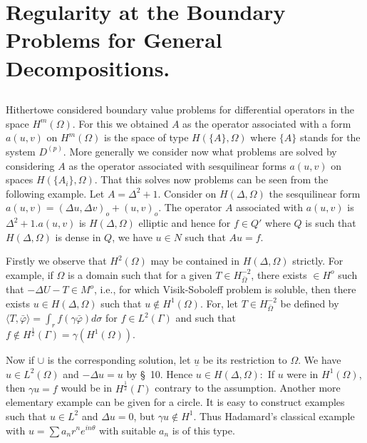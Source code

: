 \section[Regularity at the Boundary Problems for...]{Regularity at the Boundary Problems for General Decompositions.}\label{lec24:sec13}%

\subsection{}\label{lec24:sec13:subsec1} 

Hitherto\pageoriginale we considered boundary value problems for differential 
operators in the space $H^m (\Omega)$. For this we obtained $A$ as the
operator associated with a form $a (u, v)$ on $H^m(\Omega)$ is the
space of type $H(\{A\}, \Omega)$ where $\{A\}$ stands for the system
$D^{(p)}$. More generally we consider now what problems are solved by
considering $A$ as the operator associated with sesquilinear forms
$a(u, v)$ on spaces $H(\{A_i\}, \Omega)$. That this solves now
problems can be seen from the following example. Let $A = \Delta^2 +
1$. Consider on $H(\Delta, \Omega)$ the sesquilinear form $a(u, v) =
(\Delta u, \Delta v)_o + (u, v)_o$. The operator $A$ associated with
$a(u, v)$ is $\Delta^2 + 1. a(u, v)$ is $H(\Delta, \Omega)$ elliptic
and hence for $f \in Q'$ where $Q$ is such that $H (\Delta,
\Omega)$ is dense in $Q$, we have $u \in N$ such that $Au =
f$. 

Firstly we observe that $H^2 (\Omega)$ may be contained in $H(\Delta,
\Omega)$ strictly. For example, if $\Omega$ is a domain such that for
a given $T \in H^{-2}_{\bar{\Omega}}$, there exists
$\in H^o$ such that $- \Delta U- T \in M^o$, i.e., for
which Visik-Soboleff problem is soluble, then there exists $u
\in H(\Delta, \Omega)$ such that $u \notin H^1 (\Omega)$. For,
let $T \in H^{-2}_{\bar{\Omega}}$ be defined by $\langle T,
\bar{\varphi} \rangle = \int _r f (\gamma \bar{\varphi}) d \sigma $
for $f \in L^2 (\Gamma)$ and such that $f \notin
H^{\frac{1}{2}} (\Gamma) = \gamma (H^1 (\Omega))$. 

Now if $\cup$ is the corresponding solution, let $\underline{u}$ be
its restriction to $\Omega$. We have $u \in L^2 (\Omega)$ and
$- \Delta u = u $ by \S\ 10. Hence $u \in H(\Delta, \Omega):$
If $u$ were in $H^1 (\Omega)$, then $\gamma u = f$ would be in
$H^{\frac{1}{2}} (\Gamma)$ contrary to the assumption. Another more
elementary example can be given for a circle. It is easy to construct
examples such that $u \in L^2$ and $\Delta u = 0$, but $\gamma
u \notin H^1$. Thus Hadamard's classical example with $u = \sum a_n
r^n e^{in \theta}$ with suitable $a_n$ is of this type. 

